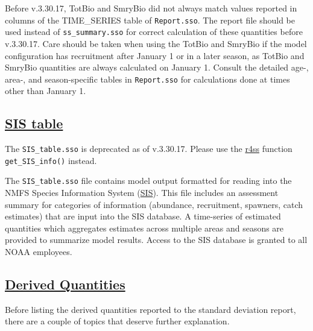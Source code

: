Before v.3.30.17, TotBio and SmryBio did not always match values reported in columns of the TIME\_SERIES table of \texttt{Report.sso}. The report file should be used instead of \texttt{ss\_summary.sso} for correct calculation of these quantities before v.3.30.17. Care should be taken when using the TotBio and SmryBio if the model configuration has recruitment after January 1 or in a later season, as TotBio and SmryBio quantities are always calculated on January 1. Consult the detailed age-, area-, and season-specific tables in \texttt{Report.sso} for calculations done at times other than January 1.

\hypertarget{SIStable}{}
\subsection[SIS table]{\protect\hyperlink{SIStable}{SIS table}}
The \texttt{SIS\_table.sso} is deprecated as of v.3.30.17. Please use the \hyperref[sec:r4ss]{r4ss} function \texttt{get\_SIS\_info()} instead. 

The \texttt{SIS\_table.sso} file contains model output formatted for reading into the NMFS Species Information System (\href{https://www.st.nmfs.noaa.gov/sis/}{SIS}). This file includes an assessment summary for categories of information (abundance, recruitment, spawners, catch estimates) that are input into the SIS database. A time-series of estimated quantities which aggregates estimates across multiple areas and seasons are provided to summarize model results. Access to the SIS database is granted to all NOAA employees.

\hypertarget{DerivedQuant}{}
\subsection[Derived Quantities]{\protect\hyperlink{DerivedQuant}{Derived Quantities}}
Before listing the derived quantities reported to the standard deviation report, there are a couple of topics that deserve further explanation.

\hypertarget{VirginUnfished}{}
